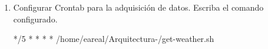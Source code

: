 \documentclass{article}
\begin{document}
\begin{enumerate}
\begin{verbatim}

cat << 'EOF' > ~/Arquitectura-/get-weather.sh
#!/bin/bash
python3 ~/Arquitectura-/clima.py
EOF

chmod +x ~/Arquitectura-/get-weather.sh
ls -la ~/Arquitectura-/get-weather.sh

\end{verbatim}

\begin{verbatim}
-rwxr-xr-x 1 eareal LeonardoRodriguez 45 Jun 25 22:01 /home/eareal/Arquitectura-/get-weather.sh
\end{verbatim}

\item Configurar Crontab para la adquisición de datos. Escriba el comando
configurado.

*/5 * * * * /home/eareal/Arquitectura-/get-weather.sh
\end{enumerate}
\end{document}

